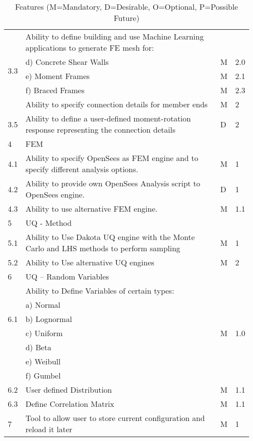 \begin{table}[hbt!]
\begin{adjustbox}{max width=\textwidth}
\begin{tabular}{llll}
	\multirow{5}{*}{3.3} & Ability to define building and use Machine Learning applications to generate FE mesh for: &  &  \\ 
	 & d)     Concrete Shear Walls & M & 2.0 \\ 
	 & e)     Moment Frames & M & 2.1 \\ 
	 & f)      Braced Frames & M & 2.3  \\ \hline

	3.4 & Ability to specify connection details for member ends & M & 2 \\ \hline
	3.5 & Ability to define a user-defined moment-rotation response representing the connection details & D & 2 \\ \hline
	4 & FEM &  &  \\ \hline
	4.1 & Ability to specify OpenSees as FEM engine and to specify different analysis options. & M & 1 \\ \hline
	4.2 & Ability to provide own OpenSees Analysis script to OpenSees engine. & D & 1 \\ \hline
	4.3 & Ability to use alternative FEM engine. & M & 1.1 \\ \hline
	5 & UQ - Method &  &  \\ \hline
	5.1 & Ability to Use Dakota UQ engine with the Monte Carlo and LHS methods to perform sampling & M & 1 \\ \hline
	5.2 & Ability to Use alternative UQ engines & M & 2 \\ \hline
	6 & UQ – Random Variables &  &  \\ \hline
	\multirow{5}{*}{6.1} & Ability to Define Variables of certain types: &  &  \\ 
	 & a)     Normal &  &  \\ 
	 & b)     Lognormal &  &  \\ 
	 & c)     Uniform & M  & 1.0 \\ 
	 & d)     Beta &  &  \\ 
	 & e)     Weibull &  &  \\ 
	 & f)      Gumbel &  &  \\ \hline
	6.2 & User defined Distribution & M & 1.1 \\ \hline
	6.3 & Define Correlation Matrix & M & 1.1 \\ \hline
	7 & Tool to allow user to store current configuration and reload it later & M & 1 \\ 
      \bottomrule      
                            
  \end{tabular}
\end{adjustbox}
  \caption{Features (M=Mandatory, D=Desirable, O=Optional, P=Possible Future)}             
  \label{tab:features}                 
\end{table}



